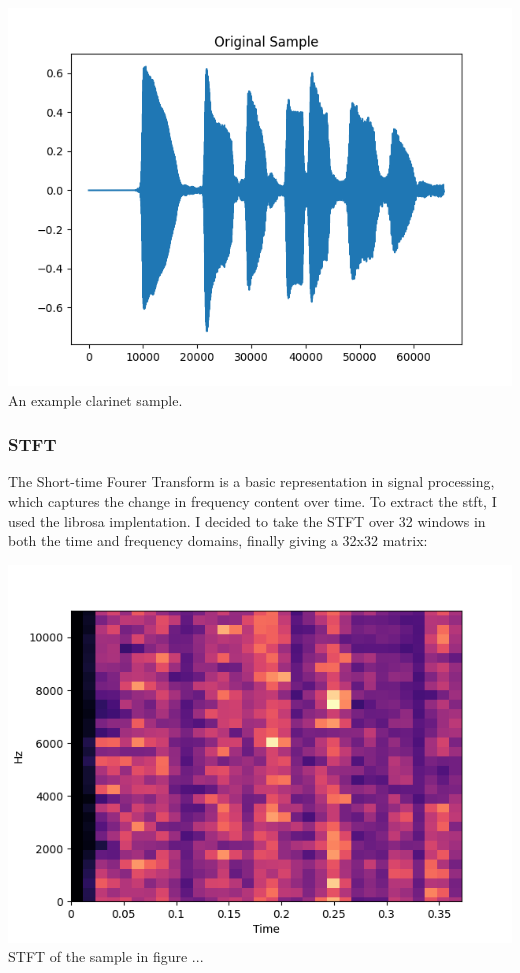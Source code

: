 \documentclass[11pt]{article}
\begin{document}
\begin{center}
\includegraphics[width=.9\linewidth]{./Figures/original_sample.png}
An example clarinet sample.
\end{center}

\subsubsection{STFT}
\label{sec:org8167530}

The Short-time Fourer Transform is a basic representation in signal processing, which captures the change in frequency content over time.
To extract the stft, I used the librosa implentation. I decided to take the STFT over 32 windows in both the time and frequency domains, finally giving a 32x32 matrix:

\begin{center}
\includegraphics[width=.9\linewidth]{./Figures/stft.png}
STFT of the sample in figure ...
\end{center}
\end{document}
